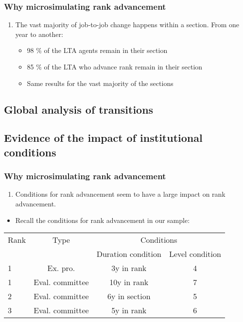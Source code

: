 \documentclass[xcolor=table,ignorenonframetext,12pt]{beamer}
\newcounter{sauvegardeenumi}
\newcommand{\asuivre}{\setcounter{sauvegardeenumi}{\theenumi}}
\newcommand{\suite}{\setcounter{enumi}{\thesauvegardeenumi}}
\begin{document}
\begin{frame}
\frametitle{Why microsimulating rank advancement}

\begin{enumerate}
	\suite
	\item The vast majority of job-to-job change happens within a section. From one year to another:
	\begin{itemize}
		\item 98 \% of the LTA agents remain in their section
		\item 85 \% of the LTA who advance rank remain in their section
		\item Same results for the vast majority of the sections
	\end{itemize}
	\asuivre
\end{enumerate}
\end{frame}

\subsection{Global analysis of transitions}

\subsection{Evidence of the impact of institutional conditions}


\begin{frame}




\frametitle{Why microsimulating rank advancement}
\begin{enumerate}
	\suite
	\item Conditions for rank advancement seem to have a large impact on rank advancement.
\end{enumerate}
\begin{itemize}
	\item Recall the conditions for rank advancement in our sample:
\end{itemize}
\begin{table}
\small
\begin{tabular}{l|c|cc}

\toprule
 Rank  & Type &  \multicolumn{2}{c}{Conditions}  \\
		&  			&  Duration condition	&  Level condition \\
\midrule
1  &	Ex. pro. 	&   3y in rank  & 	4  \\
1  &	Eval. committee 	& 	10y in rank &	7   \\ \midrule
2  & 	Eval. committee		& 	6y in section  &	5   \\ \midrule
3  & 	Eval. committee		& 	5y in rank  &	6   \\	
%	
\bottomrule
\end{tabular}
\end{table}

\end{frame}
\end{document}
